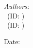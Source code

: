 \begin{titlepage}
\begin{flushleft} \large
\textit{Authors:}\\
\reportauthorOne~(ID: \cidOne)\\ %
\reportauthorTwo~(ID: \cidTwo)\\ %
\end{flushleft}
\vspace{4cm}
\makeatletter
Date: \@date 

\vfill %



\makeatother


\end{titlepage}

